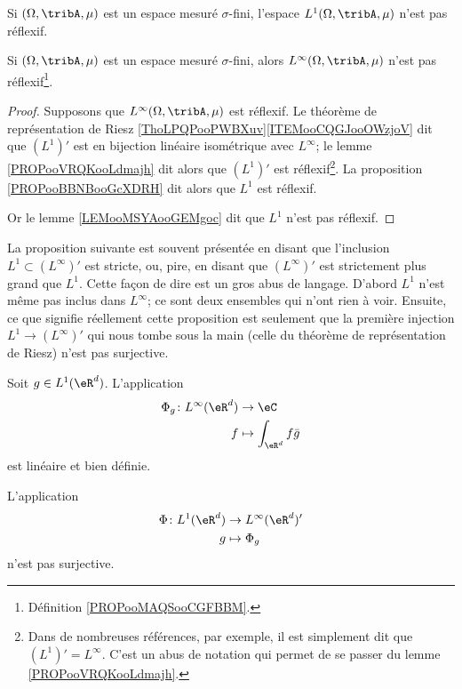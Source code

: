 \begin{lemma}        \label{LEMooMSYAooGEMgoc}
	Si \( (\Omega,\tribA,\mu)\) est un espace mesuré \( \sigma\)-fini, l'espace \( L^1(\Omega,\tribA,\mu)\) n'est pas réflexif.
\end{lemma}

\begin{lemma}     \label{LEMooUSXTooFvpsVd}
	Si \( (\Omega,\tribA,\mu)\) est un espace mesuré \( \sigma\)-fini, alors \( L^{\infty}(\Omega,\tribA,\mu)\) n'est pas réflexif\footnote{Définition \ref{PROPooMAQSooCGFBBM}.}.
\end{lemma}

\begin{proof}
	Supposons que \( L^{\infty}(\Omega,\tribA,\mu)\) est réflexif. Le théorème de représentation de Riesz \ref{ThoLPQPooPWBXuv}\ref{ITEMooCQGJooOWzjoV} dit que \( (L^1)'\) est en bijection linéaire isométrique avec \( L^{\infty}\); le lemme \ref{PROPooVRQKooLdmajh} dit alors que \( (L^1)'\) est réflexif\footnote{Dans de nombreuses références, par exemple\cite{BIBooFDGQooYferue}, il est simplement dit que \( (L^1)'=L^{\infty}\). C'est un abus de notation qui permet de se passer du lemme \ref{PROPooVRQKooLdmajh}.}. La proposition \ref{PROPooBBNBooGcXDRH} dit alors que \( L^1\) est réflexif.

	Or le lemme \ref{LEMooMSYAooGEMgoc} dit que \( L^1\) n'est pas réflexif.
\end{proof}

La proposition suivante est souvent présentée en disant que l'inclusion \( L^1\subset (L^{\infty})'\) est stricte, ou, pire, en disant que \( (L^{\infty})'\) est strictement plus grand que \( L^1\). Cette façon de dire est un gros abus de langage. D'abord \( L^1\) n'est même pas inclus dans \( L^{\infty}\); ce sont deux ensembles qui n'ont rien à voir. Ensuite, ce que signifie réellement cette proposition est seulement que la première injection \( L^1\to (L^{\infty})'\) qui nous tombe sous la main (celle du théorème de représentation de Riesz) n'est pas surjective.
\begin{proposition}     \label{PROPooXXRQooNSBZOi}
	Soit \( g\in L^1(\eR^d)\). L'application
	\begin{equation}
		\begin{aligned}
			\Phi_g\colon L^{\infty}(\eR^d) & \to \eC                     \\
			f                              & \mapsto \int_{\eR^d}f\bar g
		\end{aligned}
	\end{equation}
	est linéaire et bien définie.

	L'application
	\begin{equation}
		\begin{aligned}
			\Phi\colon L^1(\eR^d) & \to L^{\infty}(\eR^d)' \\
			g                     & \mapsto \Phi_g
		\end{aligned}
	\end{equation}
	n'est pas surjective.
\end{proposition}


